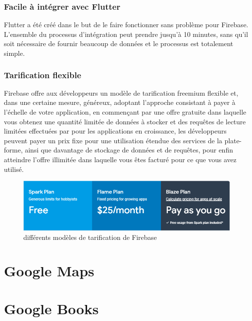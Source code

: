 \subsubsection{Facile à intégrer avec Flutter}
Flutter a été créé dans le but de le faire fonctionner sans problème pour Firebase. L'ensemble du processus d'intégration peut prendre jusqu'à 10 minutes, sans qu'il soit nécessaire de fournir beaucoup de données et le processus est totalement simple.\cite{noauthor_using_nodate}

\subsubsection{Tarification flexible}
Firebase offre aux développeurs un modèle de tarification \gls{freemium} flexible et, dans une certaine mesure, généreux, adoptant l’approche consistant à payer à l’échelle de votre application, en commençant par une offre gratuite dans laquelle vous obtenez une quantité limitée de données à stocker et des requêtes de lecture limitées effectuées par pour les applications en croissance, les développeurs peuvent payer un prix fixe pour une utilisation étendue des services de la plate-forme, ainsi que davantage de stockage de données et de requêtes, pour enfin atteindre l'offre illimitée dans laquelle vous êtes facturé pour ce que vous avez utilisé.\cite{noauthor_firebase_nodate}\bigskip

\begin{figure}[h]
	\begin{center}
		\includegraphics[width=14cm]{Images/chapter2/firebase_pricing_offers.png}
		\caption{{\footnotesize différents modèles de tarification de Firebase}}
	\end{center}
\end{figure}

\section{Google Maps}

\section{Google Books}